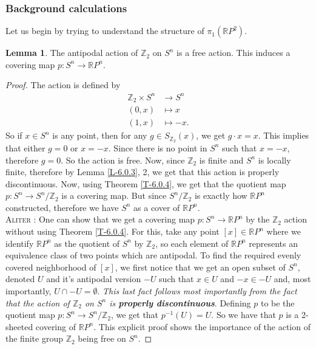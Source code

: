 \documentclass[letterpaper,11pt,twoside]{article}
\theoremstyle{definition}
\theoremstyle{definition}
\theoremstyle{definition}
\theoremstyle{definition}
\newtheorem{lemma}[proposition]{\textbf{Lemma}}
\theoremstyle{definition}
\theoremstyle{definition}
\theoremstyle{remark}
\theoremstyle{definition}
\newcommand{\R}[0]{\mathbb{R}}
\newcommand{\Z}[0]{\mathbb{Z}}
\newcommand{\RP}[0]{\R P}
\begin{document}
\subsubsection{Background calculations}
Let us begin by trying to understand the structure of $ \pi_1(\RP^{2}) $.
\begin{lemma}\label{L-6.2.1}
	The antipodal action of $ \Z_2 $ on $ S^{n} $ is a free action. This induces a covering map $ p: S^{n} \to \RP^{n} $.
\end{lemma}
\begin{proof}
	The action is defined by
	\begin{align*}
		\Z_2 \times S^{n}&\longrightarrow S^{n}\\
		(0,x)&\longmapsto x\\
		(1,x)&\longmapsto -x.
	\end{align*}
	So if $ x\in S^{n} $ is any point, then for any $ g\in S_{\Z_2}(x) $, we get $ g\cdot x = x $. This implies that either $ g= 0 $ or $ x=-x $. Since there is no point in $ S^{n} $ such that $ x=-x $, therefore $ g= 0 $. So the action is free. Now, since $ \Z_2 $ is finite and $ S^{n} $ is locally finite, therefore by Lemma \ref{L-6.0.3}, 2, we get that this action is properly discontinuous. Now, using Theorem \ref{T-6.0.4}, we get that the quotient map $ p : S^{n} \to S^{n}/\Z_2 $ is a covering map. But since $ S^{n}/\Z_2 $ is exactly how $ \RP^{n} $ constructed, therefore we have $ S^{n} $ as a cover of $ \RP^{n} $.\\
	
	{\scshape{Aliter : }}One can show that we get a covering map $ p : S^{n} \to \RP^{n}$ by the $ \Z_2 $ action without using Theorem \ref{T-6.0.4}. For this, take any point $ [x]\in \RP^{n} $ where we identify $ \RP^{n} $ as the quotient of $ S^{n} $ by $ \Z_2 $, so each element of $ \RP^{n} $ represents an equivalence class of two points which are antipodal. To find the required evenly covered neighborhood of $ [x] $, we first notice that we get an open subset of $ S^{n} $, denoted $ U $ and it's antipodal version $ -U $ such that $ x\in U $ and $ -x\in -U $ and, most importantly, $ U\cap -U = \emptyset $. \textit{This last fact follows most importantly from the fact that the action of $ \Z_2 $ on $ S^{n} $ is \textbf{properly discontinuous}}. Defining $ p $ to be the quotient map $ p : S^{n} \to S^{n}/\Z_2 $, we get that $ p^{-1}(U) = U $. So we have that $ p $ is a 2-sheeted covering of $ \RP^{n} $. This explicit proof shows the importance of the action of the finite group $ \Z_2 $ being free on $ S^{n} $.
\end{proof}
\end{document}
